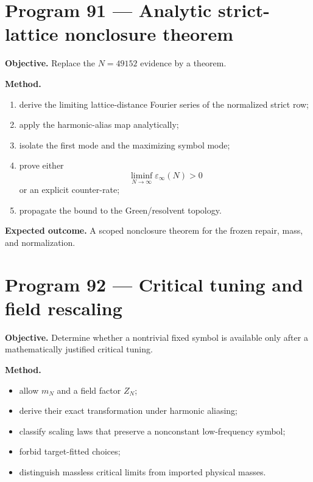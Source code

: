 \documentclass[11pt,a4paper,openany]{report}
\begin{document}
\section{Program 91 --- Analytic strict-lattice nonclosure theorem}

\textbf{Objective.} Replace the \(N=49152\) evidence by a theorem.

\textbf{Method.}

\begin{enumerate}
\item 
derive the limiting lattice-distance Fourier series of the normalized strict row;

\item 
apply the harmonic-alias map analytically;

\item 
isolate the first mode and the maximizing symbol mode;

\item 
prove either \[
   \liminf_{N\to\infty}\varepsilon_\infty(N)>0
   \] or an explicit counter-rate;

\item 
propagate the bound to the Green/\allowbreak{}resolvent topology.

\end{enumerate}

\textbf{Expected outcome.} A scoped nonclosure theorem for the frozen repair, mass, and normalization.

\section{Program 92 --- Critical tuning and field rescaling}

\textbf{Objective.} Determine whether a nontrivial fixed symbol is available only after a mathematically justified critical tuning.

\textbf{Method.}

\begin{itemize}
\item 
allow \(m_N\) and a field factor \(Z_N\);

\item 
derive their exact transformation under harmonic aliasing;

\item 
classify scaling laws that preserve a nonconstant low-frequency symbol;

\item 
forbid target-fitted choices;

\item 
distinguish massless critical limits from imported physical masses.

\end{itemize}
\end{document}
